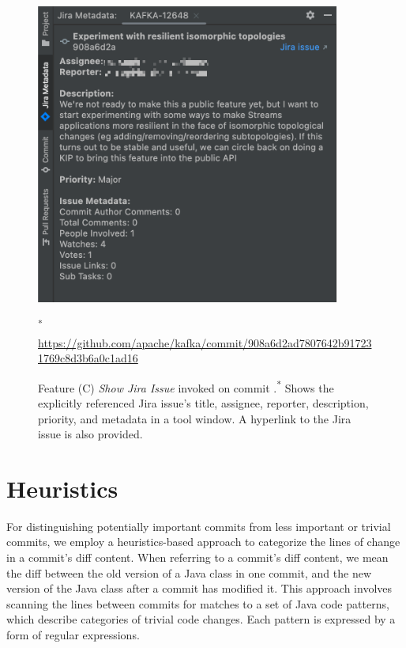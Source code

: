 \begin{figure}[h]
    \center
    \includegraphics[width=10cm]{./images/intelligent-history-C.png}
    \caption{
        Feature (C) \emph{Show Jira Issue} invoked on commit .\textsuperscript{*}
        Shows the explicitly referenced Jira issue's title, assignee, reporter, description, priority, and metadata in a tool window. A hyperlink to the Jira issue is also provided.
    }
    \scriptsize\textsuperscript{*} \url{https://github.com/apache/kafka/commit/908a6d2ad7807642b917231769c8d3b6a0c1ad16}
    \label{fig:Intelligent-History-C}
\end{figure}

\section{Heuristics}
\label{sec:Heuristics}

For distinguishing potentially important commits from less important or trivial commits, we employ a heuristics-based approach to categorize the lines of change in a commit's diff content.
When referring to a commit's diff content, we mean the diff between the old version of a Java class in one commit, and the new version of the Java class after a commit has modified it.
This approach involves scanning the lines between commits for matches to a set of Java code patterns, which describe categories of trivial code changes.
Each pattern is expressed by a form of regular expressions.

